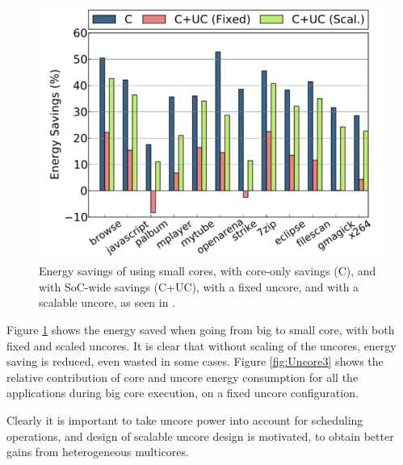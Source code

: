 \begin{figure}[htb]
    \centering
    \includegraphics[width=1.0\textwidth]{Figures/Heterogeneous/Uncore2}
    \caption{Energy savings of using small cores, with core-only savings (C), and with SoC-wide savings (C+UC), with a fixed uncore, and with a scalable uncore, as seen in \cite{heterogeneous-uncore}.}
    \label{fig:Uncore2}
\end{figure}

Figure \ref{fig:Uncore2} shows the energy saved when going from big to small core, with both fixed and scaled uncores.
It is clear that without scaling of the uncores, energy saving is reduced, even wasted in some cases.
Figure \ref{fig:Uncore3} shows the relative contribution of core and uncore energy consumption for all the applications during big core execution, on a fixed uncore configuration.

Clearly it is important to take uncore power into account for scheduling operations, and design of scalable uncore design is motivated, to obtain better gains from heterogeneous multicores. 

